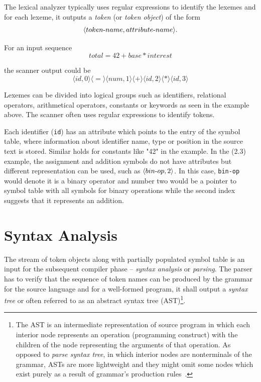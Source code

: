 \documentclass[
  digital, %
  table,   %
  lof,     %
  lot,     %
  oneside,
]{fithesis3}
\begin{document}
The lexical analyzer typically uses regular expressions to identify the lexemes and for each lexeme, it outputs a \textit{token} (or \textit{token object}) of the form 
\begin{equation}
  \langle token \textnormal{-} name, attribute \textnormal{-} name \rangle \textnormal{.}
\end{equation}

\noindent
For an input sequence 
\begin{equation}
  total = 42 + base * interest
\end{equation}
 
the scanner output could be
\begin{equation}
  \langle id, 0 \rangle 
  \langle = \rangle 
  \langle num, 1 \rangle 
  \langle + \rangle 
  \langle id, 2 \rangle 
  \langle * \rangle 
  \langle id, 3 \rangle
\end{equation}

Lexemes can be divided into logical groups such as identifiers, relational operators, arithmetical operators, constants or keywords as seen in the example above. The scanner often uses regular expressions to identify tokens.

Each identifier (\texttt{id}) has an attribute which points to the entry of the symbol table, where information about identifier name, type or position in the source text is stored. Similar holds for constants like "42" in the example. In the (2.3) example, the assignment and addition symbols do not have attributes but different representation can be used, such as $ \langle bin \textnormal{-} op, 2 \rangle $. In this case, \texttt{bin-op} would denote it is a binary operator and number two would be a pointer to symbol table with all symbols for binary operations while the second index suggests that it represents an addition.

  \section{Syntax Analysis}
The stream of token objects along with partially populated symbol table is an input for the subsequent compiler phase -- \textit{syntax analysis} or \textit{parsing}. The parser has to verify that the sequence of token names can be produced by the grammar for the source language and for a well-formed program, it shall output a \textit{syntax tree} or often referred to as an abstract syntax tree (AST)\footnote{The AST is an intermediate representation of source program in which each interior node represents an operation (programming construct) with the children of the node representing the arguments of that operation. As opposed to \textit{parse syntax tree}, in which interior nodes are nonterminals of the grammar, ASTs are more lightweight and they might omit some nodes which exist purely as a result of grammar's production rules~\cite{secure-programming-with-sca}.}.
\end{document}

